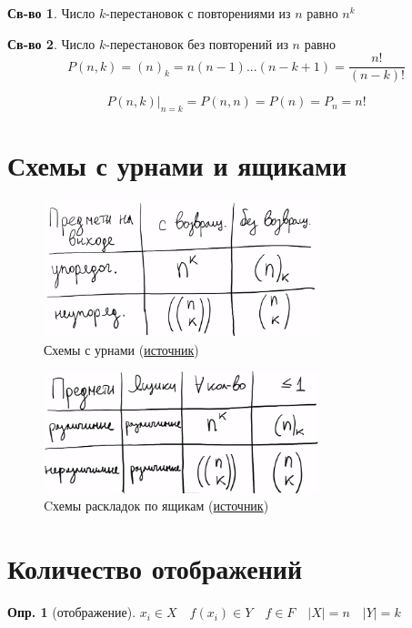 \documentclass[a4paper,12pt]{article}
\numberwithin{figure}{section}
\theoremstyle{definition}
\newtheorem{definition}{Опр.}[section]
\newtheorem*{property}{Св-во}  %
\theoremstyle{definition}
\begin{document}
\begin{property}
	Число $k$-перестановок с повторениями из $n$ равно $n^k$
\end{property}

\begin{property}
	Число $k$-перестановок без повторений из $n$ равно
	\[ P(n,k) = (n)_k = n(n-1)...(n-k+1) = \frac{n!}{(n-k)!} \]
\end{property}

\[ P(n,k) \Bigr|_{n=k} = P(n,n) = P(n) = P_n = n! \]



\section{Схемы с урнами и ящиками}

\begin{figure}[H]
	\centering
	\includegraphics[width=8cm]{schemi-urni.png}
	\caption{Схемы с урнами (\href{https://stepik.org/lesson/9483/step/2}{источник})}
\end{figure}


\begin{figure}[H]
	\centering
	\includegraphics[width=8cm]{schemi-yashiki.png}
	\caption{Cхемы раскладок по ящикам (\href{https://stepik.org/lesson/9483/step/3}{источник})}
\end{figure}


\section{Количество отображений}

\begin{definition}[отображение]
	$x_i \in X \quad f(x_i) \in Y \quad f \in F\quad |X|=n \quad |Y|=k$
\end{definition}
\end{document}
